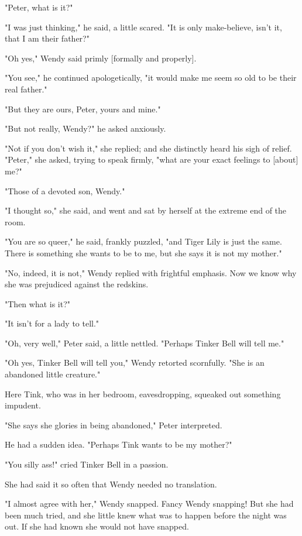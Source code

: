 "Peter, what is it?"


"I was just thinking," he said, a little scared. "It is only make-believe,
isn't it, that I am their father?"


"Oh yes," Wendy said primly [formally and properly].


"You see," he continued apologetically, "it would make me seem so old to
be their real father."


"But they are ours, Peter, yours and mine."


"But not really, Wendy?" he asked anxiously.


"Not if you don't wish it," she replied; and she distinctly heard his sigh
of relief. "Peter," she asked, trying to speak firmly, "what are your
exact feelings to [about] me?"


"Those of a devoted son, Wendy."


"I thought so," she said, and went and sat by herself at the extreme end
of the room.


"You are so queer," he said, frankly puzzled, "and Tiger Lily is just the
same. There is something she wants to be to me, but she says it is not my
mother."


"No, indeed, it is not," Wendy replied with frightful emphasis. Now we
know why she was prejudiced against the redskins.


"Then what is it?"


"It isn't for a lady to tell."


"Oh, very well," Peter said, a little nettled. "Perhaps Tinker Bell will
tell me."


"Oh yes, Tinker Bell will tell you," Wendy retorted scornfully. "She is an
abandoned little creature."


Here Tink, who was in her bedroom, eavesdropping, squeaked out something
impudent.


"She says she glories in being abandoned," Peter interpreted.


He had a sudden idea. "Perhaps Tink wants to be my mother?"


"You silly ass!" cried Tinker Bell in a passion.


She had said it so often that Wendy needed no translation.


"I almost agree with her," Wendy snapped. Fancy Wendy snapping! But she
had been much tried, and she little knew what was to happen before the
night was out. If she had known she would not have snapped.


